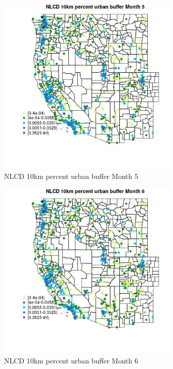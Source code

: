\begin{figure} 
\centering  
\includegraphics[width=0.77\textwidth]{Code_Outputs/Report_ML_input_PM25_Step4_part_e_de_duplicated_aves_compiled_2019-05-21wNAs_MapObsMo5NLCD_10km_percent_urban_buffer.jpg} 
\caption{\label{fig:Report_ML_input_PM25_Step4_part_e_de_duplicated_aves_compiled_2019-05-21wNAsMapObsMo5NLCD_10km_percent_urban_buffer}NLCD 10km percent urban buffer Month 5} 
\end{figure} 
 

\begin{figure} 
\centering  
\includegraphics[width=0.77\textwidth]{Code_Outputs/Report_ML_input_PM25_Step4_part_e_de_duplicated_aves_compiled_2019-05-21wNAs_MapObsMo6NLCD_10km_percent_urban_buffer.jpg} 
\caption{\label{fig:Report_ML_input_PM25_Step4_part_e_de_duplicated_aves_compiled_2019-05-21wNAsMapObsMo6NLCD_10km_percent_urban_buffer}NLCD 10km percent urban buffer Month 6} 
\end{figure} 
 

